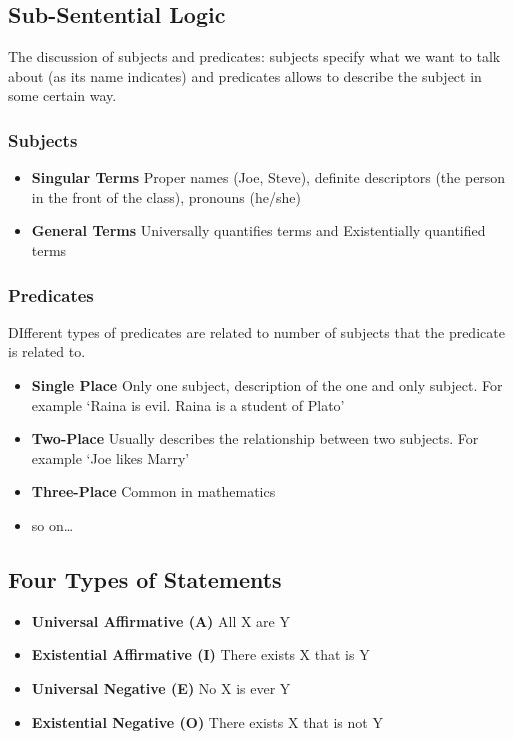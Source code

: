 \documentclass[10pt]{article}
\begin{document}
\subsection{Sub-Sentential Logic} The discussion of subjects and predicates: subjects specify what we want to talk about (as its name indicates) and predicates allows to describe the subject in some certain way. 
\subsubsection{Subjects}
\begin{itemize}
    \item \textbf{Singular Terms} Proper names (Joe, Steve), definite descriptors (the person in the front of the class), pronouns (he/she)
    \item \textbf{General Terms} Universally quantifies terms and Existentially quantified terms
\end{itemize}
\subsubsection{Predicates}
DIfferent types of predicates are related to number of subjects that the predicate is related to. 
\begin{itemize}
    \item \textbf{Single Place} Only one subject, description of the one and only subject. For example `Raina is evil. Raina is a student of Plato'
    \item \textbf{Two-Place} Usually describes the relationship between two subjects. For example `Joe likes Marry'
    \item \textbf{Three-Place} Common in mathematics
    \item so on\dots
\end{itemize}

\subsection{Four Types of Statements}
\begin{itemize}
    \item \textbf{Universal Affirmative (A)} All X are Y
    \item \textbf{Existential Affirmative (I)} There exists X that is Y
    \item \textbf{Universal Negative (E)} No X is ever Y
    \item \textbf{Existential Negative (O)} There exists X that is not Y
\end{itemize}
\end{document}
